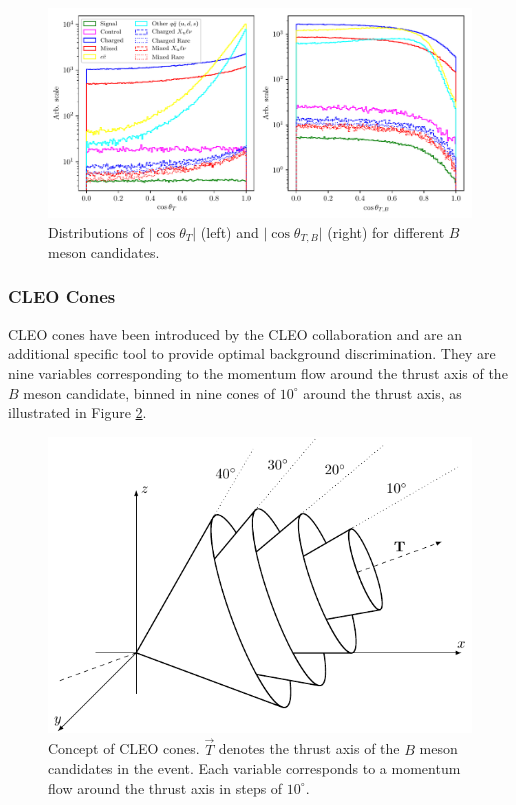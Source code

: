 \begin{figure}[H]
	\centering
	\captionsetup{width=0.8\linewidth}
	\includegraphics[width=\linewidth]{fig/cs_cosplots}
	\caption{Distributions of $\vert \cos\theta_T\vert$ (left) and $\vert \cos\theta_{T,B}\vert$ (right) for different $B$ meson candidates.}
	\label{fig:cosplots}
\end{figure}

\subsubsection{CLEO Cones}
CLEO cones have been introduced by the CLEO collaboration \cite{asner1996search} and are an additional specific tool to provide optimal background discrimination. They are nine variables corresponding to the momentum flow around the thrust axis of the $B$ meson candidate, binned in nine cones of $10^\circ$ around the thrust axis, as illustrated in Figure \ref{fig:ccones}. 

\begin{figure}[H]
	\centering
	\captionsetup{width=0.8\linewidth}
	\includegraphics[scale=1]{texfig/CCones}
	\caption{Concept of CLEO cones. $\vec{T}$ denotes the thrust axis of the $B$ meson candidates in the event. Each variable corresponds to a momentum flow around the thrust axis in steps of $10^\circ$.}
	\label{fig:ccones}
\end{figure}

